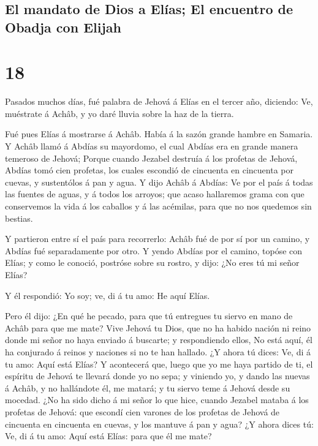 \hypertarget{el-mandato-de-dios-a-eluxedas-el-encuentro-de-obadja-con-elijah}{%
\subsection{El mandato de Dios a Elías; El encuentro de Obadja con
Elijah}\label{el-mandato-de-dios-a-eluxedas-el-encuentro-de-obadja-con-elijah}}

\hypertarget{section-11-18}{%
\section{18}\label{section-11-18}}

 Pasados muchos días, fué palabra de Jehová á Elías en el
tercer año, diciendo: Ve, muéstrate á Achâb, y yo daré lluvia sobre la
haz de la tierra.

 Fué pues Elías á mostrarse á Achâb. Había á la sazón
grande hambre en Samaria.  Y Achâb llamó á Abdías su
mayordomo, el cual Abdías era en grande manera temeroso de Jehová;
 Porque cuando Jezabel destruía á los profetas de Jehová,
Abdías tomó cien profetas, los cuales escondió de cincuenta en cincuenta
por cuevas, y sustentólos á pan y agua.  Y dijo Achâb á
Abdías: Ve por el país á todas las fuentes de aguas, y á todos los
arroyos; que acaso hallaremos grama con que conservemos la vida á los
caballos y á las acémilas, para que no nos quedemos sin bestias.

 Y partieron entre sí el país para recorrerlo: Achâb fué
de por sí por un camino, y Abdías fué separadamente por otro.
 Y yendo Abdías por el camino, topóse con Elías; y como le
conoció, postróse sobre su rostro, y dijo: ¿No eres tú mi señor Elías?

 Y él respondió: Yo soy; ve, di á tu amo: He aquí Elías.

 Pero él dijo: ¿En qué he pecado, para que tú entregues tu
siervo en mano de Achâb para que me mate?  Vive Jehová tu
Dios, que no ha habido nación ni reino donde mi señor no haya enviado á
buscarte; y respondiendo ellos, No está aquí, él ha conjurado á reinos y
naciones si no te han hallado.  ¿Y ahora tú dices: Ve, di
á tu amo: Aquí está Elías?  Y acontecerá que, luego que
yo me haya partido de ti, el espíritu de Jehová te llevará donde yo no
sepa; y viniendo yo, y dando las nuevas á Achâb, y no hallándote él, me
matará; y tu siervo teme á Jehová desde su mocedad.  ¿No
ha sido dicho á mi señor lo que hice, cuando Jezabel mataba á los
profetas de Jehová: que escondí cien varones de los profetas de Jehová
de cincuenta en cincuenta en cuevas, y los mantuve á pan y agua?
 ¿Y ahora dices tú: Ve, di á tu amo: Aquí está Elías:
para que él me mate?

